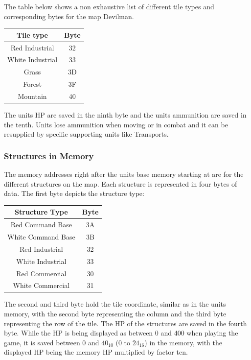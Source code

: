 The table below shows a non exhaustive list of different tile types and corresponding bytes for the map Devilman.

\begin{tabular}{|c|c|}
	\hline
	Tile type & Byte \\
	\hline
	Red Industrial & 32 \\
	\hline
	White Industrial & 33 \\
	\hline
	Grass & 3D \\
	\hline
	Forest & 3F \\
	\hline
	Mountain & 40  \\
	\hline
\end{tabular}

The units HP are saved in the ninth byte and the units ammunition are saved in the tenth. Units lose ammunition when moving or in combat and it can be resupplied by specific supporting units like Transports.

\subsubsection{Structures in Memory}
The memory addresses right after the units base memory starting at  are for the different structures on the map.
Each structure is represented in four bytes of data.
The first byte depicts the structure type:

\begin{tabular}{|c|c|}
	\hline
	Structure Type & Byte \\
	\hline
	Red Command Base & 3A \\
	\hline
	White Command Base & 3B \\
	\hline
	Red Industrial & 32 \\
	\hline
	White Industrial & 33 \\
	\hline
	Red Commercial & 30 \\
	\hline
	White Commercial & 31 \\
	\hline
\end{tabular}

The second and third byte hold the tile coordinate, similar as in the units memory, with the second byte representing the column and the third byte representing the row of the tile.
The HP of the structures are saved in the fourth byte.
While the HP is being displayed as between 0 and 400 when playing the game, it is saved between 0 and $40_{10}$ (0 to $24_{16}$) in the memory, with the displayed HP being the memory HP multiplied by factor ten.

